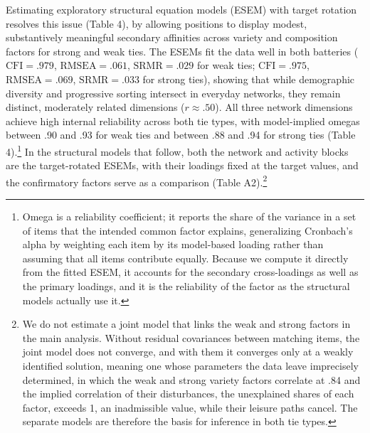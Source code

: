 \documentclass[
  12pt
]{article}
\begin{document}
Estimating exploratory structural equation models (ESEM) with target rotation resolves this issue (Table 4), by allowing positions to display modest, substantively meaningful secondary affinities across variety and composition factors for strong and weak ties. The ESEMs fit the data well in both batteries ($\text{CFI} = .979$, $\text{RMSEA} = .061$, $\text{SRMR} = .029$ for weak ties; $\text{CFI} = .975$, $\text{RMSEA} = .069$, $\text{SRMR} = .033$ for strong ties), showing that while demographic diversity and progressive sorting intersect in everyday networks, they remain distinct, moderately related dimensions ($r \approx .50$). All three network dimensions achieve high internal reliability across both tie types, with model-implied omegas between .90 and .93 for weak ties and between .88 and .94 for strong ties (Table 4).\footnote{Omega is a reliability coefficient; it reports the share of the variance in a set of items that the intended common factor explains, generalizing Cronbach's alpha by weighting each item by its model-based loading rather than assuming that all items contribute equally. Because we compute it directly from the fitted ESEM, it accounts for the secondary cross-loadings as well as the primary loadings, and it is the reliability of the factor as the structural models actually use it.} In the structural models that follow, both the network and activity blocks are the target-rotated ESEMs, with their loadings fixed at the target values, and the confirmatory factors serve as a comparison (Table A2).\footnote{We do not estimate a joint model that links the weak and strong factors in the main analysis. Without residual covariances between matching items, the joint model does not converge, and with them it converges only at a weakly identified solution, meaning one whose parameters the data leave imprecisely determined, in which the weak and strong variety factors correlate at .84 and the implied correlation of their disturbances, the unexplained shares of each factor, exceeds 1, an inadmissible value, while their leisure paths cancel. The separate models are therefore the basis for inference in both tie types.}
\end{document}

